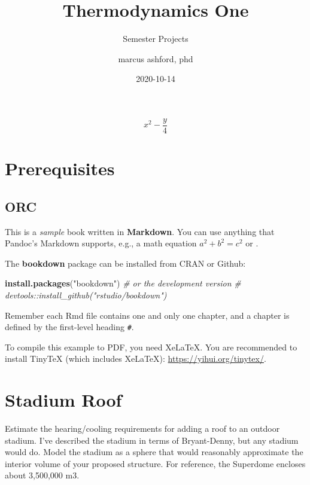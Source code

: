 \documentclass[
]{book}
\title{Thermodynamics One}
\subtitle{Semester Projects}
\author{marcus ashford, phd}
\date{2020-10-14}
\newenvironment{Shaded}{\begin{snugshade}}{\end{snugshade}}
\newcommand{\CommentTok}[1]{\textcolor[rgb]{0.56,0.35,0.01}{\textit{#1}}}
\newcommand{\KeywordTok}[1]{\textcolor[rgb]{0.13,0.29,0.53}{\textbf{#1}}}
\newcommand{\NormalTok}[1]{#1}
\newcommand{\StringTok}[1]{\textcolor[rgb]{0.31,0.60,0.02}{#1}}
\begin{document}
\maketitle

{
\setcounter{tocdepth}{1}
\tableofcontents
}
\begin{equation}
x^2 - \frac{y}{4}
\end{equation}

\hypertarget{prerequisites}{%
\chapter*{Prerequisites}\label{prerequisites}}

\hypertarget{orc}{%
\section{ORC}\label{orc}}

This is a \emph{sample} book written in \textbf{Markdown}. You can use anything that Pandoc's Markdown supports, e.g., a math equation \(a^2 + b^2 = c^2\) or  .

The \textbf{bookdown} package can be installed from CRAN or Github:

\begin{Shaded}
\begin{Highlighting}[]
\KeywordTok{install.packages}\NormalTok{(}\StringTok{"bookdown"}\NormalTok{)}
\CommentTok{\# or the development version}
\CommentTok{\# devtools::install\_github("rstudio/bookdown")}
\end{Highlighting}
\end{Shaded}

Remember each Rmd file contains one and only one chapter, and a chapter is defined by the first-level heading \texttt{\#}.

To compile this example to PDF, you need XeLaTeX. You are recommended to install TinyTeX (which includes XeLaTeX): \url{https://yihui.org/tinytex/}.

\mainmatter

\hypertarget{stadium-roof}{%
\chapter{Stadium Roof}\label{stadium-roof}}

Estimate the hearing/cooling requirements for adding a roof to an outdoor stadium. I've described the stadium in terms of Bryant-Denny, but any stadium would do. Model the stadium as a sphere that would reasonably approximate the interior volume of your proposed structure. For reference, the Superdome encloses about 3,500,000 m3.
\end{document}
